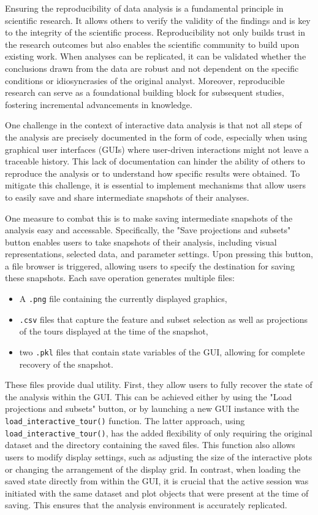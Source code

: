 \documentclass[article]{ajs}
\begin{document}
Ensuring the reproducibility of data analysis is a fundamental principle in scientific research. It allows others to verify the validity of the findings and is key to the integrity of the scientific process. Reproducibility not only builds trust in the research outcomes but also enables the scientific community to build upon existing work. When analyses can be replicated, it can be validated whether the conclusions drawn from the data are robust and not dependent on the specific conditions or idiosyncrasies of the original analyst. Moreover, reproducible research can serve as a foundational building block for subsequent studies, fostering incremental advancements in knowledge.

One challenge in the context of interactive data analysis is that not all steps of the analysis are precisely documented in the form of code, especially when using graphical user interfaces (GUIs) where user-driven interactions might not leave a traceable history. This lack of documentation can hinder the ability of others to reproduce the analysis or to understand how specific results were obtained. To mitigate this challenge, it is essential to implement mechanisms that allow users to easily save and share intermediate snapshots of their analyses.

One measure to combat this is to make saving intermediate snapshots of the analysis easy and accessable. Specifically, the "Save projections and subsets" button enables users to take snapshots of their analysis, including visual representations, selected data, and parameter settings. Upon pressing this button, a file browser is triggered, allowing users to specify the destination for saving these snapshots. Each save operation generates multiple files:


\begin{itemize}
    \item A \texttt{.png} file containing the currently displayed graphics,
    \item \texttt{.csv} files that capture the feature and subset selection as well as projections of the tours displayed at the time of the snapshot,
    \item two \texttt{.pkl} files that contain state variables of the GUI, allowing for complete recovery of the snapshot.
\end{itemize}

These files provide dual utility. First, they allow users to fully recover the state of the analysis within the GUI. This can be achieved either by using the "Load projections and subsets" button, or by launching a new GUI instance with the \texttt{load\_interactive\_tour()} function. The latter approach, using \texttt{load\_interactive\_tour()}, has the added flexibility of only requiring the original dataset and the directory containing the saved files. This function also allows users to modify display settings, such as adjusting the size of the interactive plots or changing the arrangement of the display grid. In contrast, when loading the saved state directly from within the GUI, it is crucial that the active session was initiated with the same dataset and plot objects that were present at the time of saving. This ensures that the analysis environment is accurately replicated.
\end{document}
